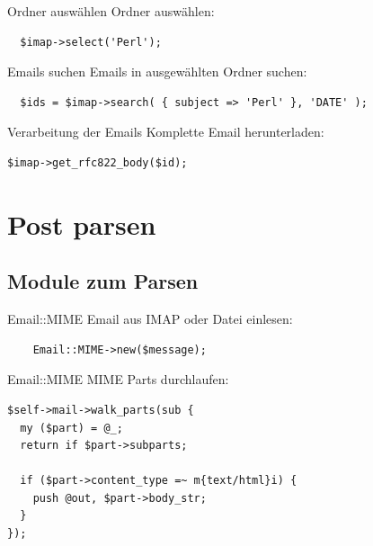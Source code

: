 \begin{frame}[fragile]{Ordner auswählen}
  Ordner auswählen:

\begin{lstlisting}
  $imap->select('Perl');
\end{lstlisting}
\end{frame}

\begin{frame}[fragile]{Emails suchen}
  Emails in ausgewählten Ordner suchen:

\begin{lstlisting}
  $ids = $imap->search( { subject => 'Perl' }, 'DATE' );
\end{lstlisting}
\end{frame}

\begin{frame}[fragile]{Verarbeitung der Emails}
  Komplette Email herunterladen:

\begin{lstlisting}
$imap->get_rfc822_body($id);
\end{lstlisting}

\end{frame}

\section{Post parsen}

\subsection{Module zum Parsen}

\begin{frame}[fragile]{Email::MIME}
  Email aus IMAP oder Datei einlesen:

  \begin{lstlisting}
    Email::MIME->new($message);
  \end{lstlisting}

\end{frame}

\begin{frame}[fragile]{Email::MIME}
MIME Parts durchlaufen:

\begin{lstlisting}
$self->mail->walk_parts(sub {
  my ($part) = @_;
  return if $part->subparts;

  if ($part->content_type =~ m{text/html}i) {
    push @out, $part->body_str;
  }
});
\end{lstlisting}
\end{frame}

